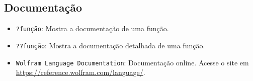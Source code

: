 \documentclass[a4paper, 12pt]{article}
\begin{document}
\subsection{Documentação}\label{documentacao}

\begin{itemize}
    \item \texttt{?função}: Mostra a documentação de uma função.
    \item \texttt{??função}: Mostra a documentação detalhada de uma função.
    \item \texttt{Wolfram Language Documentation}: Documentação online.  Acesse o site em \url{https://reference.wolfram.com/language/}.
\end{itemize}
\end{document}
